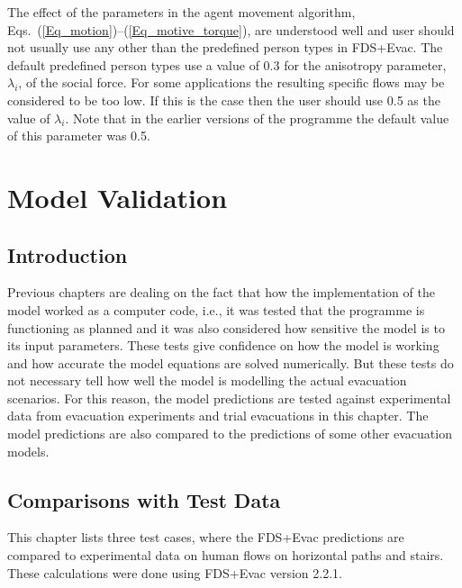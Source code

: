 \documentclass[12pt,a4paper,final,twoside]{stylevk}
\begin{document}
The effect of the parameters in the agent movement algorithm,
Eqs.~(\ref{Eq_motion})--(\ref{Eq_motive_torque}), are understood well and
user should not usually use any other than the predefined person types
in FDS+Evac.  The default predefined person types use a value of 0.3
for the anisotropy parameter, $\lambda_i$, of the social force.  For
some applications the resulting specific flows may be considered to be
too low.  If this is the case then the user should use 0.5 as the
value of $\lambda_i$.  Note that in the earlier versions of the
programme the default value of this parameter was 0.5.

\clearpage

\newpage


\chapter{Model Validation}\label{Sec_ModelValid}


\section{Introduction}

\noindent Previous chapters are dealing on the fact that how the
implementation of the model worked as a computer code, i.e., it
was tested that the programme is functioning as planned and it was
also considered how sensitive the model is to its input parameters.
These tests give confidence on how the model is working and how
accurate the model equations are solved numerically.  But these tests
do not necessary tell how well the model is modelling the actual
evacuation scenarios.  For this reason, the model predictions are
tested against experimental data from evacuation experiments and trial
evacuations in this chapter.  The model predictions are also compared
to the predictions of some other evacuation models.



\section{Comparisons with Test Data}

\noindent This chapter lists three test cases, where the FDS+Evac
predictions are compared to experimental data on human flows on
horizontal paths and stairs.  These calculations were done using
FDS+Evac version 2.2.1.
\end{document}
